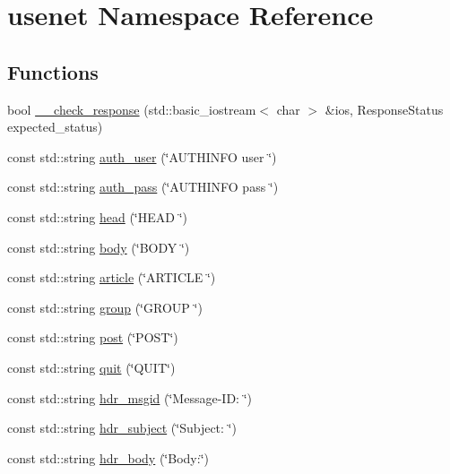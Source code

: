 \hypertarget{namespaceusenet}{}\section{usenet Namespace Reference}
\label{namespaceusenet}
\subsection*{Functions}
\begin{DoxyCompactItemize}
\item 
bool \hyperlink{namespaceusenet_a3880af028008eb3419757afa4a932e48}{\+\_\+\+\_\+check\+\_\+response} (std\+::basic\+\_\+iostream$<$ char $>$ \&ios, Response\+Status expected\+\_\+status)
\item 
const std\+::string \hyperlink{namespaceusenet_a543536caf44c46e1ef91b03409a1bc99}{auth\+\_\+user} (\char`\"{}A\+U\+T\+H\+I\+N\+FO user \char`\"{})
\item 
const std\+::string \hyperlink{namespaceusenet_a266baf03d35982ff183bfdcb01326b01}{auth\+\_\+pass} (\char`\"{}A\+U\+T\+H\+I\+N\+FO pass \char`\"{})
\item 
const std\+::string \hyperlink{namespaceusenet_ac716943545af558fdf3da5098c8dc7e6}{head} (\char`\"{}H\+E\+AD \char`\"{})
\item 
const std\+::string \hyperlink{namespaceusenet_a100420ce7bc256dfc9b258200c6f3fa1}{body} (\char`\"{}B\+O\+DY \char`\"{})
\item 
const std\+::string \hyperlink{namespaceusenet_acd3d57602585fa5d2637f2fe850ab11f}{article} (\char`\"{}A\+R\+T\+I\+C\+LE \char`\"{})
\item 
const std\+::string \hyperlink{namespaceusenet_a2dbc6a7dd18e3c88d96656a2db9849d1}{group} (\char`\"{}G\+R\+O\+UP \char`\"{})
\item 
const std\+::string \hyperlink{namespaceusenet_a7b4ed48fa7fc89cb6dbcd606e75bbabe}{post} (\char`\"{}P\+O\+ST\char`\"{})
\item 
const std\+::string \hyperlink{namespaceusenet_abfed272110620a286d3e908f06d62f25}{quit} (\char`\"{}Q\+U\+IT\char`\"{})
\item 
const std\+::string \hyperlink{namespaceusenet_aca25673417ef48d5c9deb89b8efa4989}{hdr\+\_\+msgid} (\char`\"{}Message-\/I\+D\+: \char`\"{})
\item 
const std\+::string \hyperlink{namespaceusenet_a66133a22c8206f97b765ec5195c007fd}{hdr\+\_\+subject} (\char`\"{}Subject\+: \char`\"{})
\item 
const std\+::string \hyperlink{namespaceusenet_a52e0201d594d80ec55e7880e1c117830}{hdr\+\_\+body} (\char`\"{}Body\+:\char`\"{})

\end{DoxyCompactItemize}
